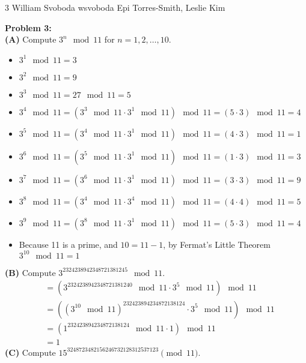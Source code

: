 \documentclass[12pt,letterpaper]{cos340hw}
\begin{document}
           {3}            %
           {William Svoboda}  %
           {wsvoboda}   %
           {Epi Torres-Smith, Leslie Kim} 




\noindent\textbf{Problem 3:}\\
\noindent\textbf{(A)} Compute $3^n \mod{11}$ for $n=1,2, \dots ,10$.
\begin{itemize}
\item $3^1 \mod{11} = 3$ 
\item $3^2 \mod{11} = 9$ 
\item $3^3 \mod{11} = 27 \mod{11} = 5$
\item $3^4 \mod{11} = (3^3 \mod{11} \cdot 3^1 \mod{11}) \mod{11} = (5 \cdot 3) \mod{11} = 4$
\item $3^5 \mod{11} = (3^4 \mod{11} \cdot 3^1 \mod{11}) \mod{11} = (4 \cdot 3) \mod{11} = 1$
\item $3^6 \mod{11} = (3^5 \mod{11} \cdot 3^1 \mod{11}) \mod{11} = (1 \cdot 3) \mod{11} = 3$
\item $3^7 \mod{11} = (3^6 \mod{11} \cdot 3^1 \mod{11}) \mod{11} = (3 \cdot 3) \mod{11} = 9$
\item $3^8 \mod{11} = (3^4 \mod{11} \cdot 3^4 \mod{11}) \mod{11} = (4 \cdot 4) \mod{11} = 5$
\item $3^9 \mod{11} = (3^8 \mod{11} \cdot 3^1 \mod{11}) \mod{11} = (5 \cdot 3) \mod{11} = 4$
\item Because 11 is a prime, and $10=11-1$, by Fermat’s Little Theorem $3^{10} \mod{11} = 1$
\end{itemize}
\noindent\textbf{(B)} Compute $3^{2324238942348721381245} \mod{11}$.
\begin{align}
	&= (3^{2324238942348721381240} \mod{11} \cdot 3^5 \mod{11}) \mod{11}\\
	&= ((3^{10} \mod{11})^{232423894234872138124} \cdot 3^5 \mod{11}) \mod{11}\\
	&= (1^{232423894234872138124} \mod{11} \cdot 1) \mod{11}\\
	&= 1
\end{align}
\noindent\textbf{(C)} Compute $15^{3248723482156246732128312537123} \pmod{11}$.
\end{document}
